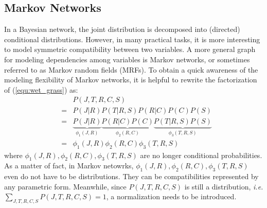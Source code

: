 \subsection{Markov Networks}
In a Bayesian network, the joint distribution is decomposed into (directed) conditional distributions. However, in many practical tasks, it is more interesting 
to model symmetric compatibility between two variables.           
A more general graph for modeling dependencies among variables is Markov networks, or sometimes referred to as Markov random fields (MRFs).      
To obtain a quick awareness of the modeling flexibility of Markov networks, it is helpful to rewrite the factorization of (\ref{equ:wet_grass}) as:    
\begin{equation}
 \begin{array}{rcl}
   & & P(J,T,R,C,S)\\
   &=& P(J|R)P(T|R,S)P(R|C)P(C)P(S) \\
   &=& \underbrace{P(J|R)}_{\phi_1(J,R)} \underbrace{P(R|C)P(C)}_{\phi_2(R,C)} \underbrace{P(T|R,S)P(S)}_{\phi_3(T,R,S)}\\
   &=& \phi_1(J,R)\phi_2(R,C)\phi_3(T,R,S)
 \end{array}
 \label{equ:BN2MN}
\end{equation}
where $\phi_1(J,R), \phi_2(R,C),\phi_3(T,R,S)$ are no longer conditional probabilities. As a matter of fact, in Markov netowrks, 
$\phi_1(J,R), \phi_2(R,C),\phi_3(T,R,S)$ even 
do not have to be distributions. They can be compatibilities represented by any parametric form. Meanwhile, since $P(J,T,R,C,S)$ is still a distribution, 
\emph{i.e.} $\sum_{J,T,R,C,S}P(J,T,R,C,S)=1$, a normalization needs to be introduced.   

